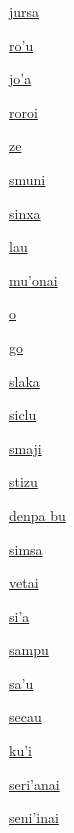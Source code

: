 {\hyperlink{val:jursa}{jursa}}{}{}{}

{\hyperlink{val:rohu}{ro'u}}{}{}{}

{\hyperlink{val:joha}{jo'a}}{}{}{}

{\hyperlink{val:roroi}{roroi}}{}{}{}

{\hyperlink{val:ze}{ze}}{}{}{}

{\hyperlink{val:smuni}{smuni}}{}{}{}

{\hyperlink{val:sinxa}{sinxa}}{}{}{}

{\hyperlink{val:lau}{lau}}{}{}{}

{\hyperlink{val:muhonai}{mu'onai}}{}{}{}

{\hyperlink{val:o}{o}}{}{}{}

{\hyperlink{val:go}{go}}{}{}{}

{\hyperlink{val:slaka}{slaka}}{}{}{}

{\hyperlink{val:siclu}{siclu}}{}{}{}

{\hyperlink{val:smaji}{smaji}}{}{}{}

{\hyperlink{val:stizu}{stizu}}{}{}{}

{\hyperlink{val:denpa bu}{denpa bu}}{}{}{}

{\hyperlink{val:simsa}{simsa}}{}{}{}

{\hyperlink{val:vetai}{vetai}}{}{}{}

{\hyperlink{val:siha}{si'a}}{}{}{}

{\hyperlink{val:sampu}{sampu}}{}{}{}

{\hyperlink{val:sahu}{sa'u}}{}{}{}

{\hyperlink{val:secau}{secau}}{}{}{}

{\hyperlink{val:kuhi}{ku'i}}{}{}{}

{\hyperlink{val:serihanai}{seri'anai}}{}{}{}

{\hyperlink{val:senihinai}{seni'inai}}{}{}{}

